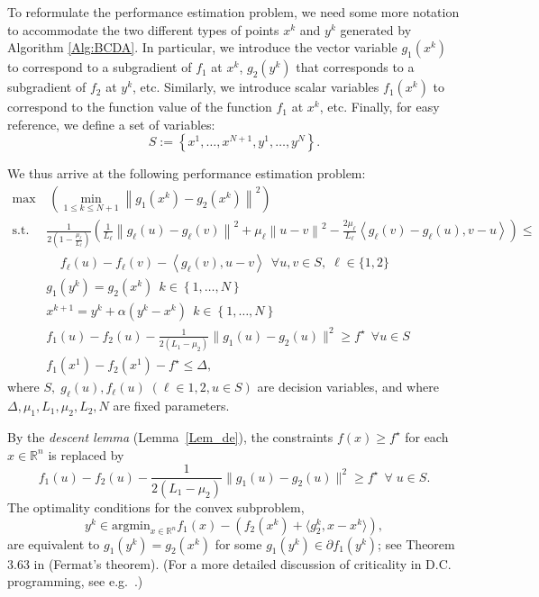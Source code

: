 \documentclass{article} %
\renewcommand{\leq}{\leqslant}
\renewcommand{\geq}{\geqslant}
\begin{document}
To reformulate the performance estimation problem, we need some more notation to accommodate the two different types of points $x^k$ and $y^k$ generated by Algorithm \ref{Alg:BCDA}.
In particular, we introduce the vector variable $g_1(x^k)$ to correspond to a subgradient of $f_1$ at $x^k$, $g_2(y^k)$ that corresponds to a subgradient of $f_2$ at $y^k$, etc. Similarly, we introduce scalar variables $f_1(x^k)$ to correspond to the function value of the function $f_1$ at $x^k$, etc. Finally, for easy reference, we define a set of variables:
\[
S := \left\{x^1,\ldots,x^{N+1},y^1,\ldots,y^{N}\right\}.
\]

We thus arrive at the following performance estimation problem:
\begin{equation}\label{PEP}
\begin{aligned}
  \max & \ \left(\min_{1\leq k\leq N+1} \left\|g_1(x^k)-g_2(x^k)\right\|^2\right)\\
 \mbox{s.t. } \ & \tfrac{1}{2(1-\tfrac{\mu_\ell}{L_\ell})}\left(\tfrac{1}{L_\ell}\left\|g_{\ell}(u)-g_{\ell}(v)\right\|^2+\mu_\ell\left\|u-v\right\|^2
-\tfrac{2\mu_\ell}{L_\ell}\left\langle g_{\ell}(v)-g_{\ell}(u),v-u\right\rangle\right)\leq\\
  & \ \ \ \ \ f_{\ell}(u)-f_{\ell}(v)-\left\langle g_{\ell}(v), u-v\right\rangle \ \ \forall  u,v \in S, \; \ell \in \{1,2\}\\
 &    g_{1}(y^k)=g_{2}(x^k) \ \ k\in\left\{1, \ldots, N\right\} \\
 & x^{k+1}= y^k + \alpha(y^{k}-x^{k}) \ \ k\in\left\{1, \ldots, N\right\} \\
&  f_1(u)-f_2(u)-\frac{1}{2(L_1-\mu_2)}\|g_1(u)-g_2(u)\|^2\geq f^\star  \ \ \forall  u \in S\\
  &  f_1(x^1)-f_2(x^1)-f^\star \leq \Delta,
\end{aligned}
\end{equation}
where $S, \; g_{\ell}(u), f_\ell(u) \; (\ell \in {1,2}, u \in S)$ are decision variables, and
where $\Delta,\mu_1,L_1,\mu_2,L_2, N$ are fixed parameters.


By the \emph{descent lemma} (Lemma~\ref{Lem_de}),
 the constraints $f(x)\geq f^\star$ for each $x\in\mathbb{R}^n$ is replaced by
\begin{equation}
\label{PEP_descent_lemma_constraints}
f_1(u)-f_2(u)-\frac{1}{2(L_1-\mu_2)}\|g_1(u)-g_2(u)\|^2\geq f^\star  \ \ \forall \; u \in S.
\end{equation}
The optimality conditions for the  convex subproblem,
\[
y^{k}\in \text{argmin}_{x\in\mathbb{R}^n} f_1(x)-\left(f_2(x^k)+\langle g_2^k, x-x^k\rangle\right),
\]
are equivalent to  $ g_{1}(y^k)=g_{2}(x^k)$ for some $g_1(y^k)\in\partial{f_1}(y^{k})$; see Theorem 3.63 in \cite{Amir} (Fermat's theorem). {(For a more detailed discussion of criticality in D.C. programming, see e.g.\ \cite[Section 2]{abbaszad2024DCA}.)}
\end{document}
